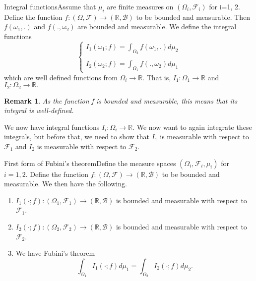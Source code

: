 \documentclass[twoside]{article}
\newtheorem{remark}[theorem]{Remark}
\newcommand{\sigmalgebra}{\mathcal{F}}
\newcommand{\borelsigmaalgebra}{\mathcal{B}}
\newcommand{\real}{\mathbb{R}}
\begin{document}
\begin{definition_exam}{Integral functions}{}Assume that $\mu_i$ are finite measures on $(\Omega_i, \sigmalgebra_i)$ for i=1, 2. Define the function $f: (\Omega,\sigmalgebra) \rightarrow (\mathbb{R}, \borelsigmaalgebra)$ to be bounded and measurable. Then $f(\omega_1,.)$ and $f(.,\omega_2)$ are bounded and measurable. We define the integral functions
$$
\begin{cases}
I_1(\omega_1;f) = \int_{\Omega_{2}}f(\omega_1,.)d\mu_2\\\\
I_2(\omega_2;f) = \int_{\Omega_{1}}f(.,\omega_2)d\mu_1
\end{cases}
$$
which are well defined functions from $\Omega_i \rightarrow \mathbb{R}.$ That is, $I_1: \Omega_1 \rightarrow \mathbb{R}$ and $I_2: \Omega_2 \rightarrow \mathbb{R}.$
\end{definition_exam}

\begin{remark}As the function f is bounded and measurable, this means that its integral is well-defined.
\end{remark}

We now have integral functions $I_i: \Omega_i \rightarrow \mathbb{R}.$ We now want to again integrate these integrals, but before that, we need to show that $I_1$ is measurable with respect to $\sigmalgebra_1$ and $I_2$ is measurable with respect to $\sigmalgebra_2.$

\begin{proposition_exam}{First form of Fubini's theorem}{}Define the measure spaces $(\Omega_i, \sigmalgebra_i, \mu_i)$ for $i = 1, 2.$ Define the function $f: (\Omega, \sigmalgebra) \rightarrow (\mathbb{R}, \borelsigmaalgebra)$ to be bounded and measurable. We then have the following.
\begin{enumerate}
\item $I_1(\cdot;f): (\Omega_1, \sigmalgebra_1) \rightarrow (\real, \borelsigmaalgebra)$ is bounded and measurable with respect to $\sigmalgebra_1$.
\item $I_2(\cdot;f): (\Omega_2, \sigmalgebra_2) \rightarrow (\real, \borelsigmaalgebra)$ is bounded and measurable with respect to $\sigmalgebra_2$. 
\item We have Fubini's theorem 
$$
\int_{\Omega_{1}}I_1(\cdot;f)d\mu_1 = \int_{\Omega_{2}}I_2(\cdot;f)d\mu_2.
$$
\end{enumerate}
\end{proposition_exam}
\end{document}
